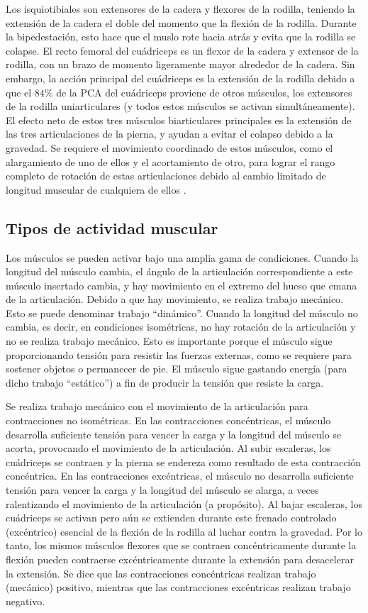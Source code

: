 \documentclass[12pt]{book}
\begin{document}
Los isquiotibiales son extensores de la cadera y flexores de la rodilla, teniendo la extensión de la cadera el doble del momento que la flexión de la rodilla. Durante la bipedestación, esto hace que el muslo rote hacia atrás y evita que la rodilla se colapse. El recto femoral del cuádriceps es un flexor de la cadera y extensor de la rodilla, con un brazo de momento ligeramente mayor alrededor de la cadera. Sin embargo, la acción principal del cuádriceps es la extensión de la rodilla debido a que el $84\%$ de la $\text{PCA}$ del cuádriceps proviene de otros músculos, los extensores de la rodilla uniarticulares (y todos estos músculos se activan simultáneamente). El efecto neto de estos tres músculos biarticulares principales es la extensión de las tres articulaciones de la pierna, y ayudan a evitar el colapso debido a la gravedad. Se requiere el movimiento coordinado de estos músculos, como el alargamiento de uno de ellos y el acortamiento de otro, para lograr el rango completo de rotación de estas articulaciones debido al cambio limitado de longitud muscular de cualquiera de ellos \cite{81}.

\subsection{Tipos de actividad muscular}

Los músculos se pueden activar bajo una amplia gama de condiciones. Cuando la longitud del músculo cambia, el ángulo de la articulación correspondiente a este músculo insertado cambia, y hay movimiento en el extremo del hueso que emana de la articulación. Debido a que hay movimiento, se realiza trabajo mecánico. Esto se puede denominar trabajo ``dinámico''. Cuando la longitud del músculo no cambia, es decir, en condiciones isométricas, no hay rotación de la articulación y no se realiza trabajo mecánico. Esto es importante porque el músculo sigue proporcionando tensión para resistir las fuerzas externas, como se requiere para sostener objetos o permanecer de pie. El músculo sigue gastando energía (para dicho trabajo ``estático'') a fin de producir la tensión que resiste la carga.

Se realiza trabajo mecánico con el movimiento de la articulación para contracciones no isométricas. En las contracciones concéntricas, el músculo desarrolla suficiente tensión para vencer la carga y la longitud del músculo se acorta, provocando el movimiento de la articulación. Al subir escaleras, los cuádriceps se contraen y la pierna se endereza como resultado de esta contracción concéntrica. En las contracciones excéntricas, el músculo no desarrolla suficiente tensión para vencer la carga y la longitud del músculo se alarga, a veces ralentizando el movimiento de la articulación (a propósito). Al bajar escaleras, los cuádriceps se activan pero aún se extienden durante este frenado controlado (excéntrico) esencial de la flexión de la rodilla al luchar contra la gravedad. Por lo tanto, los mismos músculos flexores que se contraen concéntricamente durante la flexión pueden contraerse excéntricamente durante la extensión para desacelerar la extensión. Se dice que las contracciones concéntricas realizan trabajo (mecánico) positivo, mientras que las contracciones excéntricas realizan trabajo negativo.
\end{document}
